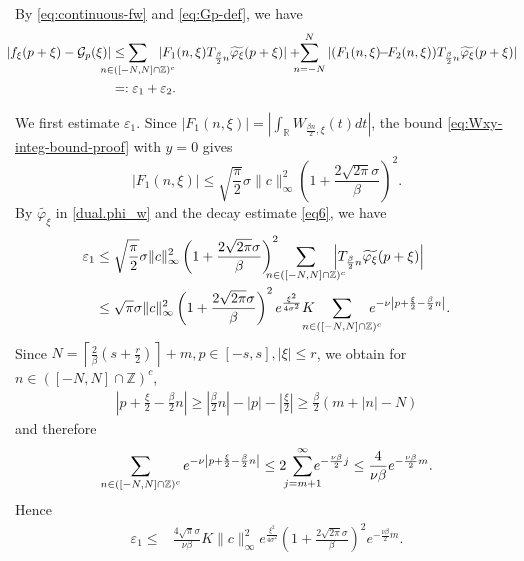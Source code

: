 \documentclass[11pt, reqno]{amsart}
\newcommand{\Z}{\mathbb{Z}}
\newcommand{\R}{\mathbb{R}}
\numberwithin{equation}{section}
\begin{document}
\begin{appendices}
By \eqref{eq:continuous-fw} and \eqref{eq:Gp-def}, we have 
\begin{align}
\hskip-.1in|f_\xi(p+\xi)-\mathcal G_p(\xi)|& \le \hskip-.3in \sum_{n \in ([-N , N] \cap \Z)^c} \hskip-.2in | F_1(n , \xi) T_{\frac{\beta}{2} n} \widetilde{\varphi_\xi} (p + \xi)| 
 +  \hskip-.1in\sum_{n = -N}^{N} | (F_1(n , \xi)\hskip-.05in -\hskip-.05in F_2(n , \xi)) T_{\frac{\beta}{2} n} \widetilde{\varphi_\xi} (p + \xi)| \notag\\
         &=: \varepsilon_1 + \varepsilon_2. 
\label{eq:error-split-proof}
\end{align}

We first estimate $\varepsilon_1$. Since 
$ |F_1(n,\xi)| = |\int_{\R} W_{\frac{\beta n}{2}, \xi} (t) dt|$,
the bound \eqref{eq:Wxy-integ-bound-proof} with $y=0$ gives
$$ |F_1(n,\xi)| \le \sqrt{\frac{\pi}{2}} \sigma \|c\|_\infty^2\left(1+\frac{2\sqrt{2\pi}\sigma}{\beta}\right)^2.$$ 
 By $\widetilde{\varphi_\xi}$ in \eqref{dual.phi_w} and the decay estimate \eqref{eq6}, we have 
\begin{align*}
\varepsilon_1 &\le \sqrt{\frac{\pi}{2}}  \sigma  \|c\|_\infty^2 \left(1+\frac{2\sqrt{2\pi}\sigma}{\beta}\right)^2\hskip-.15in \sum_{n\in([-N,N]\cap\Z)^c}\hskip-.15in\left|T_{\frac{\beta}{2}n}\widetilde{\varphi_\xi}(p+\xi)\right| \\
&\le \sqrt{\pi}\sigma \|c\|_\infty^2 \left(1+\frac{2\sqrt{2\pi}\sigma}{\beta}\right)^2e^{\frac{\xi^2}{4\sigma^2}}K\hskip-.15in\sum_{n\in([-N,N]\cap\Z)^c}\hskip-.15ine^{-\nu\left|p+\frac{\xi}{2}-\frac{\beta}{2}n\right|}.
\end{align*}
Since $ N=\left\lceil \frac{2}{\beta}\left(s+\frac{r}{2}\right)\right\rceil+m,  p\in[-s,s],
|\xi|\le r$, 
we obtain for $n\in([-N,N]\cap\Z)^c$,
\begin{align*}
    \left|p+\frac{\xi}{2}-\frac{\beta}{2}n\right| 
    \ge \left|\frac{\beta}{2}n\right|  - |p| - \left|\frac{\xi}{2}\right| 
    \ge \frac{\beta}{2}(m+|n|-N)
\end{align*}
and therefore
$$\sum_{n\in([-N,N]\cap\Z)^c} e^{-\nu\left|p+\frac{\xi}{2}-\frac{\beta}{2}n\right|}
\le 2\hskip-.05in\sum_{j=m+1}^\infty\hskip-.1in e^{-\frac{\nu\beta}{2}j} \le \frac{4}{\nu\beta}e^{-\frac{\nu\beta}{2}m}.
$$
Hence
\begin{align}\label{eq:eps1-proof}
\varepsilon_1 \le {}& \frac{4\sqrt{\pi}\sigma}{\nu\beta} K \|c\|_\infty^2 e^{\frac{\xi^2}{4\sigma^2}}
\left(1+\frac{2\sqrt{2\pi}\sigma}{\beta}\right)^2 e^{-\frac{\nu\beta}{2}m}.
\end{align}


\end{appendices}
\end{document}
